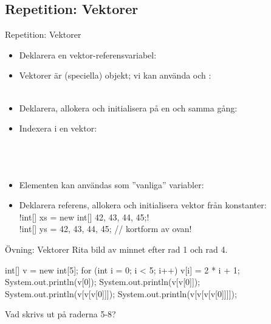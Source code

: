 \documentclass{lecturenotes}
\begin{document}
\subsection{Repetition: Vektorer}
\begin{Slide}{Repetition: Vektorer}\footnotesize
\begin{itemize}
\item Deklarera en vektor-referensvariabel: \\ 
\item Vektorer är (speciella) objekt; vi kan använda  och : \\ 
            \\
\item Deklarera, allokera och initialisera på en och samma gång: \\
\item Indexera i en vektor: \\ 
     \\
       \\
       \\    
\item Elementen kan användas som ''vanliga'' variabler: \\ 
\item Deklarera referens, allokera och initialisera vektor från konstanter: \\
\code!int[] xs = new int[] {42, 43, 44, 45};!\\
\code!int[] ys = {42, 43, 44, 45};  // kortform av ovan!

\end{itemize}
\end{Slide}

\begin{Slide}{Övning: Vektorer}
Rita bild av minnet efter rad 1 och rad 4.
\begin{Code}[numberstyle=,numbers=left]
    int[] v = new int[5];
    for (int i = 0; i < 5; i++){
        v[i] = 2 * i + 1;
    }
    System.out.println(v[0]);
    System.out.println(v[v[0]]);
    System.out.println(v[v[v[0]]]);
    System.out.println(v[v[v[v[0]]]]); 
\end{Code}
Vad skrivs ut på raderna 5-8? 
\end{Slide}
\end{document}
